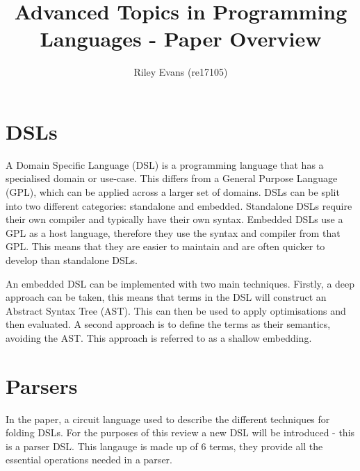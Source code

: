 \documentclass[a4paper, twocolumn, 9pt]{extarticle}
\title{\vspace{-10mm}Advanced Topics in Programming Languages - Paper Overview\vspace{-4mm}}
\author{Riley Evans (re17105)}
\date{\vspace{-3mm}}
\begin{document}
\secfont
\maketitle
\normalfont



\section{DSLs}

A Domain Specific Language (DSL) is a programming language that has a specialised domain or use-case. This differs from a General Purpose Language (GPL), which can be applied across a larger set of domains. DSLs can be split into two different categories: standalone and embedded. Standalone DSLs require their own compiler and typically have their own syntax. Embedded DSLs use a GPL as a host language, therefore they use the syntax and compiler from that GPL. This means that they are easier to maintain and are often quicker to develop than standalone DSLs.

An embedded DSL can be implemented with two main techniques. Firstly, a deep approach can be taken, this means that terms in the DSL will construct an Abstract Syntax Tree (AST). This can then be used to apply optimisations and then evaluated. A second approach is to define the terms as their semantics, avoiding the AST. This approach is referred to as a shallow embedding.


\section{Parsers}
In the paper, a circuit language used to describe the different techniques for folding DSLs. For the purposes of this review a new DSL will be introduced - this is a parser DSL. This langauge is made up of 6 terms, they provide all the essential operations needed in a parser.
\end{document}
